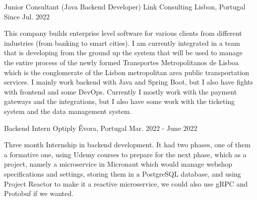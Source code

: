 


\begin{cventries}


  \cventry
  {Junior Consultant (Java Backend Developer)} %
  {Link Consulting} %
  {Lisbon, Portugal} %
  {Since Jul. 2022} %
  { %
    \begin{cvitems}
      \item This company builds enterprise level software for various clients from different industries (from banking to smart cities). I am currently integrated in a team that is developing from the ground up the system that will be used to manage the entire process of the newly formed Transportes Metropolitanos de Lisboa which is the conglomerate of the Lisbon metropolitan area public transportation services. I mainly work backend with Java and Spring Boot, but I also have fights with frontend and some DevOps. Currently I mostly work with the payment gateways and the integrations, but I also have some work with the ticketing system and the data management system.
    \end{cvitems}
  }


  \cventry
  {Backend Intern} %
  {Optiply} %
  {Évora, Portugal} %
  {Mar. 2022 - June 2022} %
  { %
    \begin{cvitems}
      \item Three month Internship in backend development. It had two phases, one of them a formative one, using Udemy courses to prepare for the next phase, which as a project, namely a microservice in Micronaut which would manage webshop specifications and settings, storing them in a PostgreSQL database, and using Project Reactor to make it a reactive microservice, we could also use gRPC and Protobuf if we wanted.
    \end{cvitems}
  }


\end{cventries}
